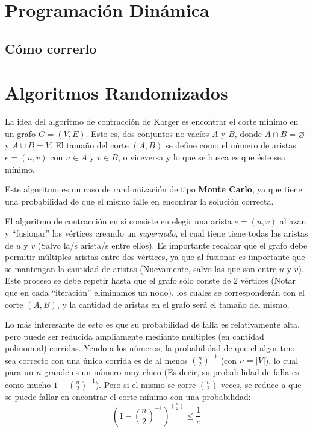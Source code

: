 \documentclass[a4paper,10pt]{article}
\begin{document}
\maketitle
\thispagestyle{empty}

\pagebreak 

\tableofcontents
\pagebreak

\clearpage
\section{Programación Dinámica}


\subsection{Cómo correrlo}


\section{Algoritmos Randomizados}
La idea del algoritmo de contracción de Karger es encontrar el corte mínimo en un grafo $G=(V,E)$. Esto es, dos conjuntos no vacíos $A$ y $B$, donde $A \cap B = \varnothing$ y $A \cup B = V$. El tamaño del corte $(A,B)$ se define como el número de aristas $e = (u,v)$ con $u \in A$ y $v \in B$, o viceversa y lo que se busca es que éste sea mínimo.

Este algoritmo es un caso de randomización de tipo \textbf{Monte Carlo}, ya que tiene una probabilidad de que el mismo falle en encontrar la solución correcta.

El algoritmo de contracción en sí consiste en elegir una arista $e=(u,v)$ al azar, y “fusionar” los vértices creando un \textit{supernodo}, el cual tiene tiene todas las aristas de $u$ y $v$ (Salvo la/s arista/s entre ellos). Es importante recalcar que el grafo debe permitir múltiples aristas entre dos vértices, ya que al fusionar es importante que se mantengan la cantidad de aristas (Nuevamente, salvo las que son entre $u$ y $v$). Este proceso se debe repetir hasta que el grafo sólo conste de 2 vértices (Notar que en cada ``iteración'' eliminamos un nodo), los cuales se corresponderán con el corte $(A,B)$, y la cantidad de aristas en el grafo será el tamaño del mismo.

Lo más interesante de esto es que su probabilidad de falla es relativamente alta, pero puede ser reducida ampliamente mediante múltiples (en cantidad polinomial) corridas. Yendo a los números, la probabilidad de que el algoritmo sea correcto con una única corrida es de al menos ${\binom{n}{2}}^{-1}$ (con $n = |V|$), lo cual para un $n$ grande es un número muy chico (Es decir, su probabilidad de falla es como mucho $1 - {\binom{n}{2}}^{-1}$). Pero si el mismo se corre $\binom{n}{2}$ veces, se reduce a que se puede fallar en encontrar el corte mínimo con una probabilidad:
\begin{equation}
	\label{eq:prob}
	(1 - {\binom{n}{2}}^{-1})^{\binom{n}{2}} \leq \frac{1}{e} \tag{2.1}
\end{equation}
\end{document}
